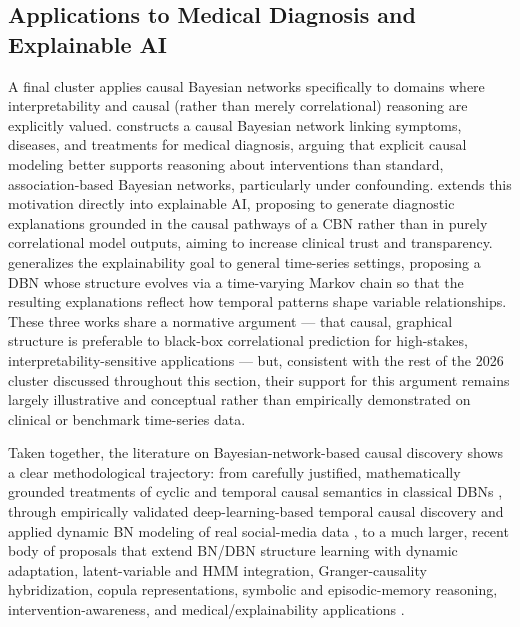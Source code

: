 \subsection{Applications to Medical Diagnosis and Explainable AI}
A final cluster applies causal Bayesian networks specifically to domains where interpretability and causal (rather than merely correlational) reasoning are explicitly valued. \cite{zhang2026causald} constructs a causal Bayesian network linking symptoms, diseases, and treatments for medical diagnosis, arguing that explicit causal modeling better supports reasoning about interventions than standard, association-based Bayesian networks, particularly under confounding. \cite{zhang2026explainable} extends this motivation directly into explainable AI, proposing to generate diagnostic explanations grounded in the causal pathways of a CBN rather than in purely correlational model outputs, aiming to increase clinical trust and transparency. \cite{zhang2026dynamicc} generalizes the explainability goal to general time-series settings, proposing a DBN whose structure evolves via a time-varying Markov chain so that the resulting explanations reflect how temporal patterns shape variable relationships. These three works share a normative argument --- that causal, graphical structure is preferable to black-box correlational prediction for high-stakes, interpretability-sensitive applications --- but, consistent with the rest of the 2026 cluster discussed throughout this section, their support for this argument remains largely illustrative and conceptual rather than empirically demonstrated on clinical or benchmark time-series data.

Taken together, the literature on Bayesian-network-based causal discovery shows a clear methodological trajectory: from carefully justified, mathematically grounded treatments of cyclic and temporal causal semantics in classical DBNs \cite{motzek2017indirect}, through empirically validated deep-learning-based temporal causal discovery \cite{nauta2019causal} and applied dynamic BN modeling of real social-media data \cite{liang2020dynamic}, to a much larger, recent body of proposals that extend BN/DBN structure learning with dynamic adaptation, latent-variable and HMM integration, Granger-causality hybridization, copula representations, symbolic and episodic-memory reasoning, intervention-awareness, and medical/explainability applications \cite{zhang2026causal,zhang2026causalb}.


